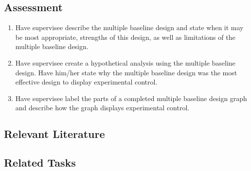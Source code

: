 \subsection{Assessment}
\begin{enumerate}
\item Have supervisee describe the multiple baseline design and state when it may be most appropriate, strengths of this design, as well as limitations of the multiple baseline design.
\item Have supervisee create a hypothetical analysis using the multiple baseline design. Have him/her state why the multiple baseline design was the most effective design to display experimental control.
\item Have supervisee label the parts of a completed multiple baseline design graph and describe how the graph displays experimental control. 
\end{enumerate}
%
\subsection{Relevant Literature}
\begin{refsection}
\nocite{test,alang2017police,clayton2018black}
\printbibliography[heading=none]
\end{refsection}
%
\subsection{Related Tasks}
\fourbThree{}\\
\fourbFour{}\\
\fourbEight{}\\
\fourbNine{}\\
\fourbTen{}\\
\fourbEleven{}\\
\foureOne{}\\
\fourhThree{}\\
\fouriFive{}\\
\fourFKThirtyThree{}\\
%
%
%
%
%
